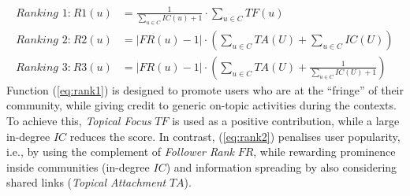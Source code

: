 \begin{align}
\textit{Ranking 1:} ~ \mathit{R1}(u) & = \frac{1}{\sum_{u \in C} \mathit{IC}(u) + 1} \cdot \sum_{u \in C} \mathit{TF}(u) \label{eq:rank1} \\
\textit{Ranking 2:} ~ \mathit{R2}(u) & = \lvert \mathit{FR}(u) - 1 \rvert \cdot \left(\sum_{u \in C} \mathit{TA}(U) + \sum_{u \in C} \mathit{IC}(U)\right) \label{eq:rank2} \\
\textit{Ranking 3:} ~ \mathit{R3}(u) & = \lvert \mathit{FR}(u) - 1 \rvert \cdot \left(\sum_{u \in C} \mathit{TA}(U) + \frac{1}{\sum_{u \in C} \mathit{IC}(U) + 1}\right) \label{eq:rank3}
\end{align}
%
Function (\ref{eq:rank1}) is designed to promote users who are at the ``fringe'' of their community, while giving credit to generic on-topic activities during the contexts. 
To achieve this, \textit{Topical Focus} $\mathit{TF}$ is used as a positive contribution, while a large in-degree $\mathit{IC}$ reduces the score.
%
In contrast,  (\ref{eq:rank2}) penalises user popularity, i.e., by using the complement of \textit{Follower Rank} $\mathit{FR}$, while rewarding prominence inside communities (in-degree $\mathit{IC}$) and information spreading by also considering shared links (\textit{Topical Attachment} $\mathit{TA}$).


